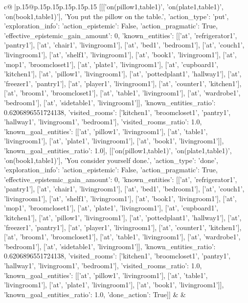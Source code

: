 \documentclass{article}
\begin{document}
{\begin{supertabular}{c@{$\;$}|p{.15\linewidth}@{}p{.15\linewidth}p{.15\linewidth}p{.15\linewidth}p{.15\linewidth}p{.15\linewidth}}
{{{	 [[['on(pillow1,table1)', 'on(plate1,table1)', 'on(book1,table1)'], 'You put the pillow on the table.', {'action_type': 'put', 'exploration_info': {'action_epistemic': False, 'action_pragmatic': True, 'effective_epistemic_gain_amount': 0, 'known_entities': [['at', 'refrigerator1', 'pantry1'], ['at', 'chair1', 'livingroom1'], ['at', 'bed1', 'bedroom1'], ['at', 'couch1', 'livingroom1'], ['at', 'shelf1', 'livingroom1'], ['at', 'book1', 'livingroom1'], ['at', 'mop1', 'broomcloset1'], ['at', 'plate1', 'livingroom1'], ['at', 'cupboard1', 'kitchen1'], ['at', 'pillow1', 'livingroom1'], ['at', 'pottedplant1', 'hallway1'], ['at', 'freezer1', 'pantry1'], ['at', 'player1', 'livingroom1'], ['at', 'counter1', 'kitchen1'], ['at', 'broom1', 'broomcloset1'], ['at', 'table1', 'livingroom1'], ['at', 'wardrobe1', 'bedroom1'], ['at', 'sidetable1', 'livingroom1']], 'known_entities_ratio': 0.6206896551724138, 'visited_rooms': ['kitchen1', 'broomcloset1', 'pantry1', 'hallway1', 'livingroom1', 'bedroom1'], 'visited_rooms_ratio': 1.0, 'known_goal_entities': [['at', 'pillow1', 'livingroom1'], ['at', 'table1', 'livingroom1'], ['at', 'plate1', 'livingroom1'], ['at', 'book1', 'livingroom1']], 'known_goal_entities_ratio': 1.0}}], [['on(pillow1,table1)', 'on(plate1,table1)', 'on(book1,table1)'], 'You consider yourself done.', {'action_type': 'done', 'exploration_info': {'action_epistemic': False, 'action_pragmatic': True, 'effective_epistemic_gain_amount': 0, 'known_entities': [['at', 'refrigerator1', 'pantry1'], ['at', 'chair1', 'livingroom1'], ['at', 'bed1', 'bedroom1'], ['at', 'couch1', 'livingroom1'], ['at', 'shelf1', 'livingroom1'], ['at', 'book1', 'livingroom1'], ['at', 'mop1', 'broomcloset1'], ['at', 'plate1', 'livingroom1'], ['at', 'cupboard1', 'kitchen1'], ['at', 'pillow1', 'livingroom1'], ['at', 'pottedplant1', 'hallway1'], ['at', 'freezer1', 'pantry1'], ['at', 'player1', 'livingroom1'], ['at', 'counter1', 'kitchen1'], ['at', 'broom1', 'broomcloset1'], ['at', 'table1', 'livingroom1'], ['at', 'wardrobe1', 'bedroom1'], ['at', 'sidetable1', 'livingroom1']], 'known_entities_ratio': 0.6206896551724138, 'visited_rooms': ['kitchen1', 'broomcloset1', 'pantry1', 'hallway1', 'livingroom1', 'bedroom1'], 'visited_rooms_ratio': 1.0, 'known_goal_entities': [['at', 'pillow1', 'livingroom1'], ['at', 'table1', 'livingroom1'], ['at', 'plate1', 'livingroom1'], ['at', 'book1', 'livingroom1']], 'known_goal_entities_ratio': 1.0}, 'done_action': True}]] 
	  } 
	   } 
	   } 
	 & & \\ 
 

    \theutterance {}  


\end{supertabular}}
\end{document}
